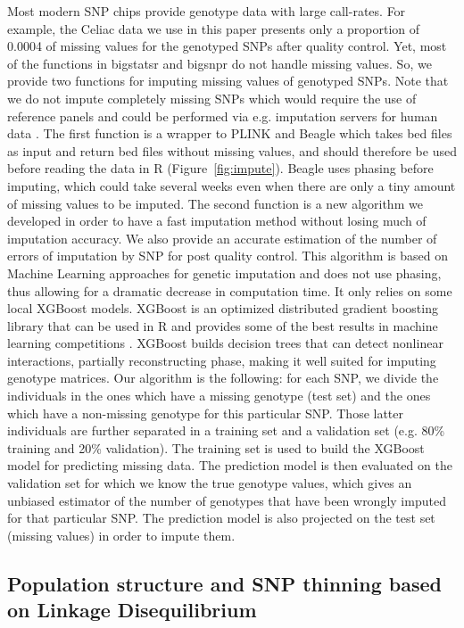 \documentclass{bioinfo}
\begin{document}
\begin{methods}
{Most modern SNP chips provide genotype data with large call-rates. For example, the Celiac data we use in this paper presents only a proportion of 0.0004 of missing values for the genotyped SNPs after quality control. Yet, most of the functions in bigstatsr and bigsnpr do not handle missing values.
So, we provide two functions for imputing missing values of genotyped SNPs. Note that we do not impute completely missing SNPs which would require the use of reference panels and could be performed via e.g. imputation servers for human data \cite[]{mccarthy2016reference}. The first function is a wrapper to PLINK and Beagle \cite[]{Browning2009} which takes bed files as input and return bed files without missing values, and should therefore be used before reading the data in R (Figure~\ref{fig:impute}). Beagle uses phasing before imputing, which could take several weeks even when there are only a tiny amount of missing values to be imputed. The second function is a new algorithm we developed in order to have a fast imputation method without losing much of imputation accuracy. We also provide an accurate estimation of the number of errors of imputation by SNP for post quality control.
This algorithm is based on Machine Learning approaches for genetic imputation \cite[]{Wang2012} and does not use phasing, thus allowing for a dramatic decrease in computation time. It only relies on some local XGBoost models. XGBoost is an optimized distributed gradient boosting library that can be used in R and provides some of the best results in machine learning competitions \cite[]{Chen2016}.
XGBoost builds decision trees that can detect nonlinear interactions, partially reconstructing phase, making it well suited for imputing genotype matrices. 
Our algorithm is the following: for each SNP, we divide the individuals in the ones which have a missing genotype (test set) and the ones which have a non-missing genotype for this particular SNP. Those latter individuals are further separated in a training set and a validation set (e.g. 80\% training and 20\% validation). The training set is used to build the XGBoost model for predicting missing data. The prediction model is then evaluated on the validation set for which we know the true genotype values, which gives an unbiased estimator of the number of genotypes that have been wrongly imputed for that particular SNP. The prediction model is also projected on the test set (missing values) in order to impute them.
}



\subsection{Population structure and SNP thinning based on Linkage Disequilibrium} 




\end{methods}
\end{document}
